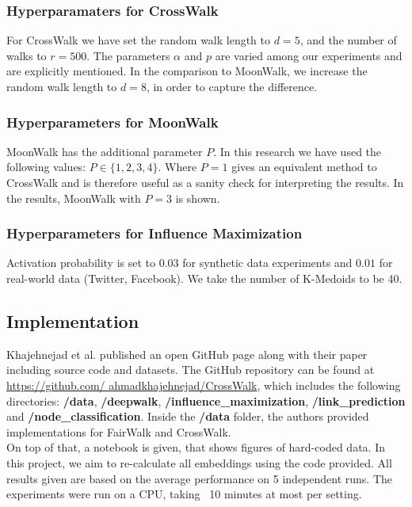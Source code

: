 \subsubsection{Hyperparamaters for CrossWalk}
For CrossWalk we have set the random walk length to $d=5$, and the number of walks to $r=500$. The parameters $\alpha$ and $p$ are varied among our experiments and are explicitly mentioned.
In the comparison to MoonWalk, we increase the random walk length to $d=8$, in order to capture the difference.

\subsubsection{Hyperparameters for MoonWalk}
MoonWalk has the additional parameter $P$. In this research we have used the following values: $P \in\{1,2,3,4\}$. Where $P=1$ gives an equivalent method to CrossWalk and is therefore useful as a sanity check for interpreting the results. In the results, MoonWalk with $P=3$ is shown.

\subsubsection{Hyperparameters for Influence Maximization}
Activation probability is set to $0.03$ for synthetic data experiments and $0.01$ for real-world data (Twitter, Facebook).
We take the number of K-Medoids to be 40.


\subsection{Implementation}
Khajehnejad et al. published an open GitHub page along with their paper including source code and datasets. The GitHub repository can be found at \hyperlink{https://github.com/ ahmadkhajehnejad/CrossWalk}{https://github.com/ ahmadkhajehnejad/CrossWalk}, which includes the following directories: \textbf{\slash data}, \textbf{\slash deepwalk}, \textbf{\slash influence\_maximization}, \textbf{\slash link\_prediction} and \textbf{\slash node\_classification}. Inside the \textbf{\slash data} folder, the authors provided implementations for FairWalk and CrossWalk.\\
On top of that, a notebook is given, that shows figures of hard-coded data. In this project, we aim to re-calculate all embeddings using the code provided. All results given are based on the average performance on 5 independent runs. The experiments were run on a CPU, taking ~10 minutes at most per setting.



